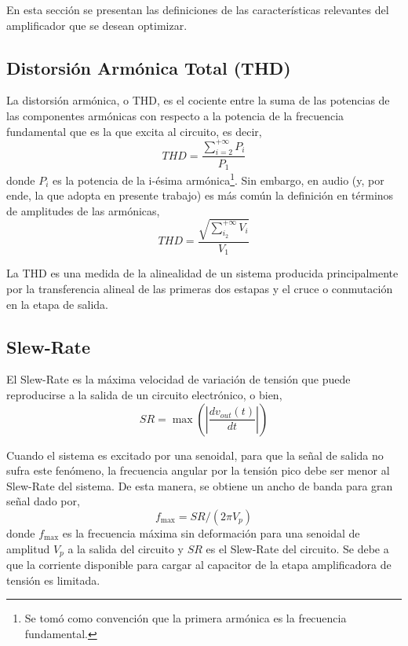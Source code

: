 \documentclass[a4paper,12pt,twoside]{article}
\begin{document}
En esta sección se presentan las definiciones de las características relevantes del amplificador que se desean optimizar.

\subsection{Distorsión Armónica Total (THD)}

La distorsión armónica, o THD,  es el cociente entre la suma de las potencias de las componentes armónicas con respecto a la potencia de la frecuencia fundamental que es la que excita al circuito, es decir,
\begin{equation} THD = \frac{\sum_{i=2}^{+\infty} P_i}{P_1} \end{equation}
donde $P_i$ es la potencia de la i-ésima armónica\footnote{Se tomó como convención que la primera armónica es la frecuencia fundamental.}. Sin embargo, en audio (y, por ende, la que adopta en presente trabajo) es más común la definición en términos de amplitudes de las armónicas,
\begin{equation} THD = \frac{\sqrt{\sum_{i_2}^{+\infty} V_i}}{V_1} \end{equation}

La THD es una medida de la alinealidad de un sistema producida principalmente por la transferencia alineal de las primeras dos estapas y el cruce o conmutación en la etapa de salida.

\subsection{Slew-Rate}

El Slew-Rate es la máxima velocidad de variación de tensión que puede reproducirse a la salida de un circuito electrónico, o bien,
\begin{equation} SR = \max \left(\left|\frac{dv_{out}(t)}{dt}\right|\right) \end{equation}

Cuando el sistema es excitado por una senoidal, para que la señal de salida no sufra este fenómeno, la frecuencia angular por la tensión pico debe ser menor al Slew-Rate del sistema. De esta manera, se obtiene un ancho de banda para gran señal dado por,
\begin{equation} f_{\max}= SR/(2 \pi V_p) \end{equation}
donde $f_{\max}$ es la frecuencia máxima sin deformación para una senoidal de amplitud $V_p$ a la salida del circuito y $SR$ es el Slew-Rate del circuito. Se debe a que la corriente disponible para cargar al capacitor de la etapa amplificadora de tensión es limitada.
\end{document}

